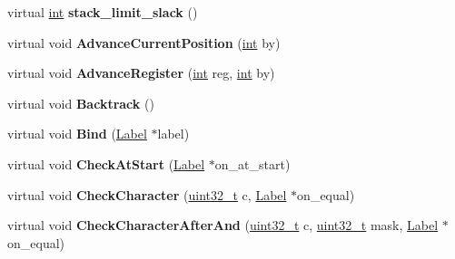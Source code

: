 \begin{DoxyCompactItemize}
virtual \mbox{\hyperlink{classint}{int}} {\bfseries stack\+\_\+limit\+\_\+slack} ()
\item 
\mbox{\label{classv8_1_1internal_1_1RegExpMacroAssemblerMIPS_a8b46dd14d6be7b20399d60416582b610}} 
virtual void {\bfseries Advance\+Current\+Position} (\mbox{\hyperlink{classint}{int}} by)
\item 
\mbox{\label{classv8_1_1internal_1_1RegExpMacroAssemblerMIPS_a9ab2276500b78ea3c12268dd9bb4ba7c}} 
virtual void {\bfseries Advance\+Register} (\mbox{\hyperlink{classint}{int}} reg, \mbox{\hyperlink{classint}{int}} by)
\item 
\mbox{\label{classv8_1_1internal_1_1RegExpMacroAssemblerMIPS_adfe2e4c2ea84a1ab5ad151218f899ded}} 
virtual void {\bfseries Backtrack} ()
\item 
\mbox{\label{classv8_1_1internal_1_1RegExpMacroAssemblerMIPS_ac4858be1e00e71c992e568de14abe61a}} 
virtual void {\bfseries Bind} (\mbox{\hyperlink{classv8_1_1internal_1_1Label}{Label}} $\ast$label)
\item 
\mbox{\label{classv8_1_1internal_1_1RegExpMacroAssemblerMIPS_a0f87ac84fa8e60eeafa27e85b258b6ab}} 
virtual void {\bfseries Check\+At\+Start} (\mbox{\hyperlink{classv8_1_1internal_1_1Label}{Label}} $\ast$on\+\_\+at\+\_\+start)
\item 
\mbox{\label{classv8_1_1internal_1_1RegExpMacroAssemblerMIPS_a0139c180148c5b5ba2ddbd15bbeaa7f9}} 
virtual void {\bfseries Check\+Character} (\mbox{\hyperlink{classuint32__t}{uint32\+\_\+t}} c, \mbox{\hyperlink{classv8_1_1internal_1_1Label}{Label}} $\ast$on\+\_\+equal)
\item 
\mbox{\label{classv8_1_1internal_1_1RegExpMacroAssemblerMIPS_a384cf9c589f2b7346e84a5d35b359b95}} 
virtual void {\bfseries Check\+Character\+After\+And} (\mbox{\hyperlink{classuint32__t}{uint32\+\_\+t}} c, \mbox{\hyperlink{classuint32__t}{uint32\+\_\+t}} mask, \mbox{\hyperlink{classv8_1_1internal_1_1Label}{Label}} $\ast$on\+\_\+equal)

\end{DoxyCompactItemize}
